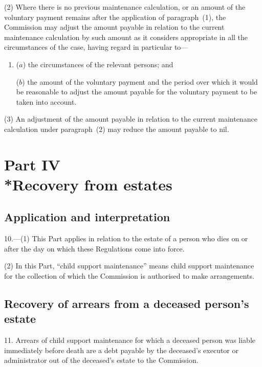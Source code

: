 \documentclass[12pt,a4paper]{article}
\begin{document}
(2) Where there is no previous maintenance calculation, or an amount of the voluntary payment remains after the application of paragraph~(1), the Commission may adjust the amount payable in relation to the current maintenance calculation by such amount as it considers appropriate in all the circumstances of the case, having regard in particular to—
\begin{enumerate}\item[]
($a$) the circumstances of the relevant persons; and

($b$) the amount of the voluntary payment and the period over which it would be reasonable to adjust the amount payable for the voluntary payment to be taken into account.
\end{enumerate}

(3) An adjustment of the amount payable in relation to the current maintenance calculation under paragraph~(2) may reduce the amount payable to nil.

\section[Part IV --- Recovery from estates]{Part IV\\*Recovery from estates}

\renewcommand\parthead{--- Part IV}

\subsection[10. Application and interpretation]{Application and interpretation}

10.---(1)  This Part applies in relation to the estate of a person who dies on or after the day on which these Regulations come into force.

(2) In this Part, “child support maintenance” means child support maintenance for the collection of which the Commission is authorised to make arrangements.

\subsection[11. Recovery of arrears from a deceased person’s estate]{Recovery of arrears from a deceased person’s estate}

11.  Arrears of child support maintenance for which a deceased person was liable immediately before death are a debt payable by the deceased’s executor or administrator out of the deceased’s estate to the Commission.
\end{document}
